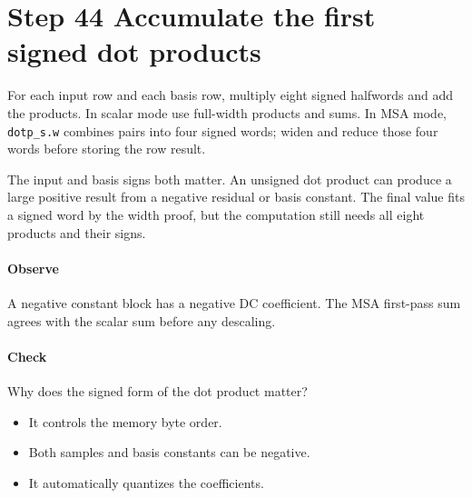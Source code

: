 \section{Step 44 Accumulate the first signed dot products}\label{h263-transform-s04}
For each input row and each basis row, multiply eight signed halfwords and add
the products. In scalar mode use full-width products and sums. In MSA mode,
\texttt{dotp\_s.w} combines pairs into four signed words; widen and reduce those
four words before storing the row result.

The input and basis signs both matter. An unsigned dot product can produce a
large positive result from a negative residual or basis constant. The final
value fits a signed word by the width proof, but the computation still needs
all eight products and their signs.

\paragraph{Observe} A negative constant block has a negative DC coefficient.
The MSA first-pass sum agrees with the scalar sum before any descaling.
\paragraph{Check} Why does the signed form of the dot product matter?
\begin{itemize}
  \item[A.] It controls the memory byte order.
  \item[B.] Both samples and basis constants can be negative.
  \item[C.] It automatically quantizes the coefficients.
\end{itemize}
